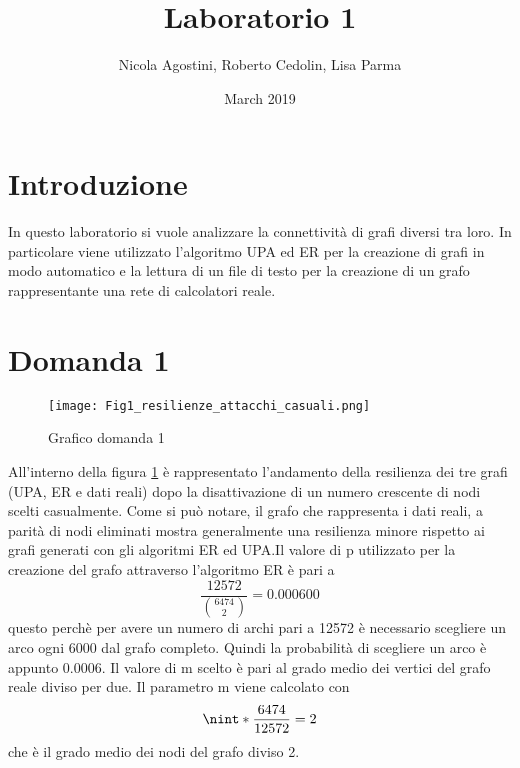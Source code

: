 \documentclass{article}
\title{Laboratorio 1}
\author{Nicola Agostini, Roberto Cedolin, Lisa Parma}
\date{March 2019}
\DeclarePairedDelimiter{\nint}\lfloor\rceil
\begin{document}
\maketitle

\section*{Introduzione}

In questo laboratorio si vuole analizzare la connettività di grafi diversi tra loro. In particolare viene utilizzato l'algoritmo UPA ed ER per la creazione di grafi in modo automatico e la lettura di un file di testo per la creazione di un grafo rappresentante una rete di calcolatori reale.
\section*{Domanda 1}
\begin{center}
\begin{figure}[h]
\texttt{[image: Fig1\_resilienze\_attacchi\_casuali.png]}
\caption{Grafico domanda 1}
\label{fig:graph1}
\end{figure}
\end{center}

All'interno della figura \ref{fig:graph1} è rappresentato l'andamento della resilienza dei tre grafi (UPA, ER e dati reali) dopo la disattivazione di un numero crescente di nodi scelti casualmente. Come si può notare, il grafo che rappresenta i dati reali, a parità di nodi eliminati mostra generalmente una resilienza minore rispetto ai grafi generati con gli algoritmi ER ed UPA.\newline Il valore di p utilizzato per la creazione del grafo attraverso l'algoritmo ER è pari a 
\[
    \frac{12572}{\binom{6474}{2}}=0.000600
\]
questo perchè per avere un numero di archi pari a 12572 è necessario scegliere un arco ogni 6000 dal grafo completo. Quindi la probabilità di scegliere un arco è appunto 0.0006.
Il valore di m scelto è pari al grado medio dei vertici del grafo reale diviso per due. Il parametro m viene calcolato con 
\[
  \nint*{\frac{6474}{12572}}=2
\]
che è il grado medio dei nodi del grafo diviso 2.

\FloatBarrier
\end{document}
